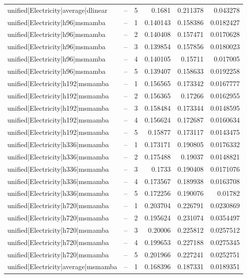 \begin{longtable}{llrrrr}
unified|Electricity|average|dlinear & -- & 5 & 0.1681 & 0.211378 & 0.043278 \\
unified|Electricity|h96|msmamba & -- & 1 & 0.140143 & 0.158386 & 0.0182427 \\
unified|Electricity|h96|msmamba & -- & 2 & 0.140408 & 0.157471 & 0.0170628 \\
unified|Electricity|h96|msmamba & -- & 3 & 0.139854 & 0.157856 & 0.0180023 \\
unified|Electricity|h96|msmamba & -- & 4 & 0.140105 & 0.15711 & 0.017005 \\
unified|Electricity|h96|msmamba & -- & 5 & 0.139407 & 0.158633 & 0.0192258 \\
unified|Electricity|h192|msmamba & -- & 1 & 0.156565 & 0.173342 & 0.0167777 \\
unified|Electricity|h192|msmamba & -- & 2 & 0.156365 & 0.17266 & 0.0162955 \\
unified|Electricity|h192|msmamba & -- & 3 & 0.158484 & 0.173344 & 0.0148595 \\
unified|Electricity|h192|msmamba & -- & 4 & 0.156624 & 0.172687 & 0.0160634 \\
unified|Electricity|h192|msmamba & -- & 5 & 0.15877 & 0.173117 & 0.0143475 \\
unified|Electricity|h336|msmamba & -- & 1 & 0.173171 & 0.190805 & 0.0176332 \\
unified|Electricity|h336|msmamba & -- & 2 & 0.175488 & 0.19037 & 0.0148821 \\
unified|Electricity|h336|msmamba & -- & 3 & 0.1733 & 0.190408 & 0.0171076 \\
unified|Electricity|h336|msmamba & -- & 4 & 0.173567 & 0.189938 & 0.0163708 \\
unified|Electricity|h336|msmamba & -- & 5 & 0.172256 & 0.190076 & 0.01782 \\
unified|Electricity|h720|msmamba & -- & 1 & 0.203704 & 0.226791 & 0.0230869 \\
unified|Electricity|h720|msmamba & -- & 2 & 0.195624 & 0.231074 & 0.0354497 \\
unified|Electricity|h720|msmamba & -- & 3 & 0.20006 & 0.225812 & 0.0257512 \\
unified|Electricity|h720|msmamba & -- & 4 & 0.199653 & 0.227188 & 0.0275345 \\
unified|Electricity|h720|msmamba & -- & 5 & 0.201966 & 0.227241 & 0.0252751 \\
unified|Electricity|average|msmamba & -- & 1 & 0.168396 & 0.187331 & 0.0189351 \\

\end{longtable}
